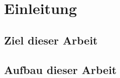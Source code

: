 %
%
% 
% 


\chapter{Einleitung}
\label{chap:intro}

\section{Ziel dieser Arbeit}
\label{sec:Unterkapitel1}

\section{Aufbau dieser Arbeit}
\label{sec:Unterkapitel2}